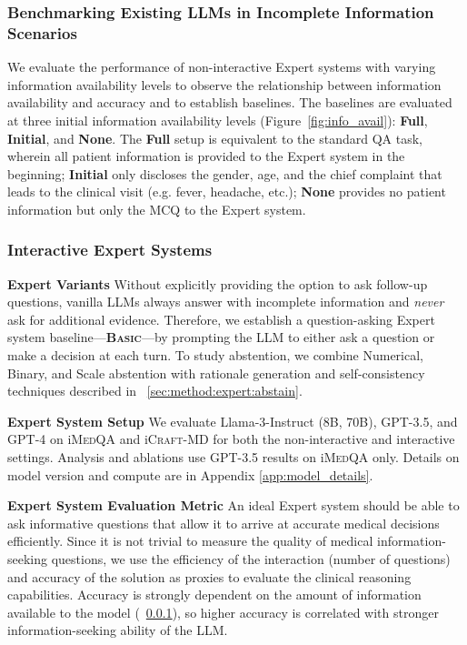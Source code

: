 \documentclass{article}
\newcommand{\Sref}[1]{\textsection~\ref{#1}}
\newcommand{\Fref}[1]{Figure~\ref{#1}}
\begin{document}
\subsubsection{Benchmarking Existing LLMs in Incomplete Information Scenarios}\label{sec:exp:non_interactive}\vspace{-0.5mm}


We evaluate the performance of non-interactive Expert systems with varying information availability levels to observe the relationship between information availability and accuracy and to establish baselines. The baselines are evaluated at three initial information availability levels (\Fref{fig:info_avail}): \textbf{Full}, \textbf{Initial}, and \textbf{None}. The \textbf{Full} setup is equivalent to the standard QA task, wherein all patient information is provided to the Expert system in the beginning; \textbf{Initial} only discloses the gender, age, and the chief complaint that leads to the clinical visit (e.g. fever, headache, etc.); \textbf{None} provides no patient information but only the MCQ to the Expert system. 




\subsubsection{Interactive Expert Systems}\label{sec:exp:interactive}\vspace{-0.5mm}

\textbf{Expert Variants}\hspace{3mm}
Without explicitly providing the option to ask follow-up questions, vanilla LLMs always answer with incomplete information and \emph{never} ask for additional evidence. Therefore, we establish a question-asking Expert system baseline---\textbf{\textsc{Basic}}---by prompting the LLM to either ask a question or make a decision at each turn. To study abstention, we combine Numerical, Binary, and Scale abstention with rationale generation and self-consistency techniques described in \Sref{sec:method:expert:abstain}.

\textbf{Expert System Setup}\hspace{3mm}
We evaluate 
Llama-3-Instruct (8B, 70B), GPT-3.5, and GPT-4 on i\textsc{MedQA} and i\textsc{Craft-MD} for both the non-interactive and interactive settings. 
Analysis and ablations use GPT-3.5 results on i\textsc{MedQA} only. Details on model version and compute are in Appendix \ref{app:model_details}.

\textbf{Expert System Evaluation Metric}\hspace{3mm}
An ideal Expert system should be able to ask informative questions that allow it to arrive at accurate medical decisions efficiently.
Since it is not trivial to measure the quality of medical information-seeking questions, we use the efficiency of the interaction (number of questions) and accuracy of the solution as proxies to evaluate the clinical reasoning capabilities. Accuracy is strongly dependent on the amount of information available to the model (\Sref{sec:exp:non_interactive}), so higher accuracy is correlated with stronger information-seeking ability of the LLM.
\end{document}
